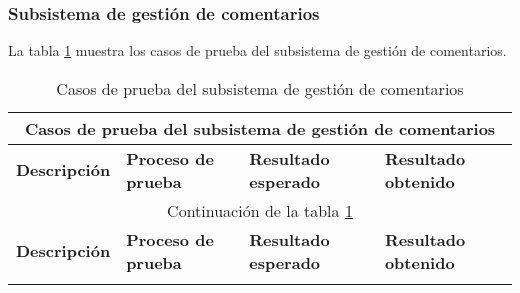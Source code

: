\begin{landscape}
\begin{longtable}[c]{|p{50mm}|p{50mm}|p{50mm}|p{50mm}|}
	 	 \end{longtable}
\end{landscape}


\begin{landscape}
	 \subsubsection{Subsistema de gestión de comentarios}
	 	La tabla \ref{table:casos_prueba_comentarios} muestra los casos de prueba del subsistema de gestión de comentarios.
	 	
	 	\begin{longtable}[c]{|p{50mm}|p{50mm}|p{50mm}|p{50mm}|}
	 	 \caption{Casos de prueba del subsistema de gestión de comentarios\label{table:casos_prueba_comentarios}}\\
	 	
	 	 \hline
	 	 \multicolumn{4}{|c|}{\textbf{Casos de prueba del subsistema de gestión de comentarios}}\\
	 	 \hline
	 	 \textbf{Descripción} & \textbf{Proceso de prueba} & \textbf{Resultado esperado} & \textbf{Resultado obtenido}\\
	 	 \hline
	 	 \hline
	 	 \endfirsthead
	 	 
	 	 \hline
	 	 \multicolumn{4}{|c|}{Continuación de la tabla \ref{table:casos_prueba_comentarios}}\\
	 	 \hline
	 	 \textbf{Descripción} & \textbf{Proceso de prueba} & \textbf{Resultado esperado} & \textbf{Resultado obtenido}\\
	 	 \hline
	 	 \hline
	 	 \endhead
	 	 
	 	 \hline
	 	 \endfoot
	 	 

\end{longtable}
\end{landscape}
